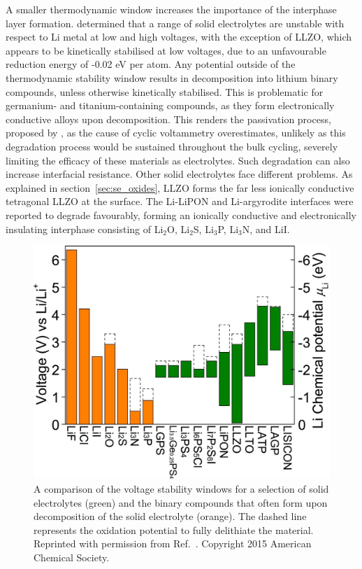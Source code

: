 \documentclass[../main.tex]{subfiles}
\begin{document}
A smaller thermodynamic window increases the importance of the interphase layer formation. \citeauthor{Zhu2015} determined that a range of solid electrolytes are unstable with respect to Li metal at low and high voltages, with the exception of LLZO, which appears to be kinetically stabilised at low voltages, due to an unfavourable reduction energy of -0.02 eV per atom. Any potential outside of the thermodynamic stability window results in decomposition into lithium binary compounds, unless otherwise kinetically stabilised. This is problematic for germanium- and titanium-containing compounds, as they form electronically conductive alloys upon decomposition.\cite{Zhu2015} This renders the passivation process, proposed by \citeauthor{Mo2012}\cite{Mo2012, Kobayashi2008}, as the cause of cyclic voltammetry overestimates, unlikely as this degradation process would be sustained throughout the bulk cycling, severely limiting the efficacy of these materials as electrolytes.\cite{Zhu2015} Such degradation can also increase interfacial resistance.\cite{Takada2008, Sakuda2010} Other solid electrolytes face different problems. As explained in section~\ref{sec:se_oxides}, LLZO forms the far less ionically conductive tetragonal LLZO at the surface. The Li-LiPON and Li-argyrodite interfaces were reported to degrade favourably, forming an ionically conductive and electronically insulating interphase consisting of Li$_2$O, Li$_2$S, Li$_3$P, Li$_3$N, and LiI.\cite{Zhu2015}

\begin{figure}[H]
    \centering
    \includegraphics[scale=0.35]{figures/zhu2015_electrochemical_windows.png}
    \caption{A comparison of the voltage stability windows for a selection of solid electrolytes (green) and the binary compounds that often form upon decomposition of the solid electrolyte (orange). The dashed line represents the oxidation potential to fully delithiate the material. Reprinted with permission from Ref.~. Copyright 2015 American Chemical Society.}
    \label{fig:se_stab}
\end{figure}
\end{document}
